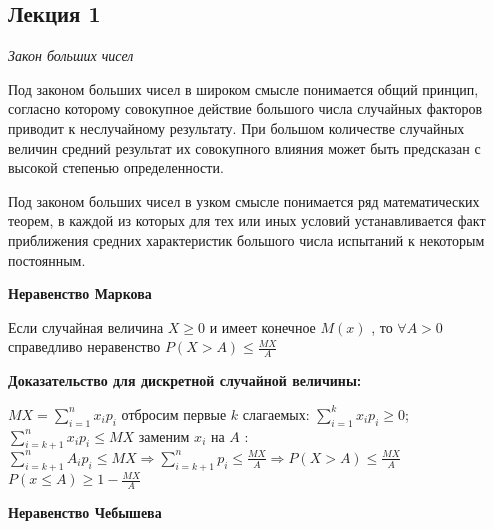 \subsection{Лекция 1}

\textit{Закон больших чисел}

Под законом больших чисел в широком смысле понимается общий принцип, согласно которому совокупное действие большого числа случайных факторов приводит к неслучайному результату.
При большом количестве случайных величин средний результат их совокупного влияния может быть предсказан с высокой степенью определенности.

Под законом больших чисел в узком смысле понимается ряд математических теорем, в каждой из которых для тех или иных условий устанавливается факт приближения средних характеристик большого числа испытаний к некоторым постоянным.

\begin{center}
    \textbf{Неравенство Маркова}
\end{center} 

Если случайная величина $X \ge 0$ и имеет конечное $M(x)$ , то $\forall A > 0$ справедливо неравенство $P(X>A) \le \frac{MX}{A}$

\textbf{Доказательство для дискретной случайной величины: }

$ MX=\sum \limits_{i=1}^{n}{x_i p_i} $ отбросим первые $k$ слагаемых: $ \sum \limits_{i=1}^{k}{x_i p_i} \ge 0 $; $ \sum \limits_{i=k+1}^{n}{x_i p_i} \le MX $ 
заменим $x_i$ на $A$ :
$ \sum \limits_{i=k+1}^{n}{A_i p_i} \le MX \Rightarrow \sum \limits_{i=k+1}^{n}{p_i} \le \frac{MX}{A} \Rightarrow P(X>A) \le \frac{MX}{A} $
$P(x \le A) \ge 1 - \frac{MX}{A}$

\begin{center}
    \textbf{Неравенство Чебышева}
\end{center} 
